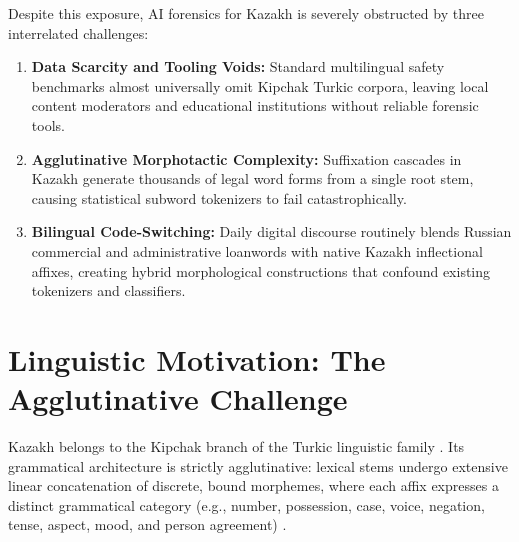 Despite this exposure, AI forensics for Kazakh is severely obstructed by three interrelated challenges:
\begin{enumerate}
    \item \textbf{Data Scarcity and Tooling Voids:} Standard multilingual safety benchmarks almost universally omit Kipchak Turkic corpora, leaving local content moderators and educational institutions without reliable forensic tools.
    \item \textbf{Agglutinative Morphotactic Complexity:} Suffixation cascades in Kazakh generate thousands of legal word forms from a single root stem, causing statistical subword tokenizers to fail catastrophically.
    \item \textbf{Bilingual Code-Switching:} Daily digital discourse routinely blends Russian commercial and administrative loanwords with native Kazakh inflectional affixes, creating hybrid morphological constructions that confound existing tokenizers and classifiers.
\end{enumerate}

\section{Linguistic Motivation: The Agglutinative Challenge}
\label{sec:intro_linguistic_challenge}

Kazakh belongs to the Kipchak branch of the Turkic linguistic family \citep{tyers2016finite}. Its grammatical architecture is strictly agglutinative: lexical stems undergo extensive linear concatenation of discrete, bound morphemes, where each affix expresses a distinct grammatical category (e.g., number, possession, case, voice, negation, tense, aspect, mood, and person agreement) \citep{oflazer1994twolevel,bekmanova2021kazakh}.


